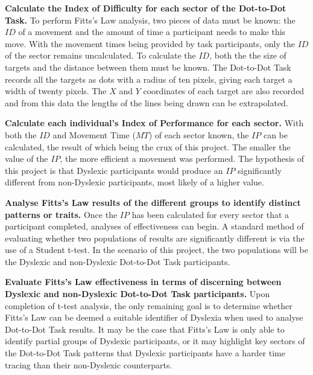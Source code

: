 			\textbf{Calculate the Index of Difficulty for each sector of the Dot-to-Dot Task.}
			To perform Fitts’s Law analysis, two pieces of data must be known: the \(ID\) of a movement and the amount of time a participant needs to make this move. With the movement times being provided by task participants, only the \(ID\) of the sector remains uncalculated. To calculate the \(ID\), both the the size of targets and the distance between them must be known. The Dot-to-Dot Task records all the targets as dots with a radius of ten pixels, giving each target a width of twenty pixels. The \(X\) and \(Y\) coordinates of each target are also recorded and from this data the lengths of the lines being drawn can be extrapolated.
			
			\textbf{Calculate each individual's Index of Performance for each sector.}
			With both the \(ID\) and Movement Time (\(MT\)) of each sector known, the \(IP\) can be calculated, the result of which being the crux of this project. The smaller the value of the \(IP\), the more efficient a movement was performed. The hypothesis of this project is that Dyslexic participants would produce an \(IP\) significantly different from non-Dyslexic participants, most likely of a higher value.
			
			\textbf{Analyse Fitts’s Law results of the different groups to identify distinct patterns or traits.}
			Once the \(IP\) has been calculated for every sector that a participant completed, analyses of effectiveness can begin. A standard method of evaluating whether two populations of results are significantly different is via the use of a Student t-test. In the scenario of this project, the two populations will be the Dyslexic and non-Dyslexic Dot-to-Dot Task participants.
			
			\textbf{Evaluate Fitts’s Law effectiveness in terms of discerning between Dyslexic and non-Dyslexic Dot-to-Dot Task participants.}
			Upon completion of t-test analysis, the only remaining goal is to determine whether Fitts’s Law can be deemed a suitable identifier of Dyslexia when used to analyse Dot-to-Dot Task results. It may be the case that Fitts’s Law is only able to identify partial groups of Dyslexic participants, or it may highlight key sectors of the Dot-to-Dot Task patterns that Dyslexic participants have a harder time tracing than their non-Dyslexic counterparts.
			
\newpage
